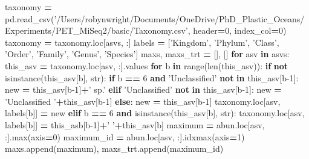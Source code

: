 \documentclass[
]{article}
\newenvironment{Shaded}{\begin{snugshade}}{\end{snugshade}}
\newcommand{\BuiltInTok}[1]{#1}
\newcommand{\ControlFlowTok}[1]{\textcolor[rgb]{0.13,0.29,0.53}{\textbf{#1}}}
\newcommand{\DecValTok}[1]{\textcolor[rgb]{0.00,0.00,0.81}{#1}}
\newcommand{\KeywordTok}[1]{\textcolor[rgb]{0.13,0.29,0.53}{\textbf{#1}}}
\newcommand{\NormalTok}[1]{#1}
\newcommand{\OperatorTok}[1]{\textcolor[rgb]{0.81,0.36,0.00}{\textbf{#1}}}
\newcommand{\StringTok}[1]{\textcolor[rgb]{0.31,0.60,0.02}{#1}}
\begin{document}
\begin{Shaded}
\begin{Highlighting}[]
\NormalTok{taxonomy }\OperatorTok{=}\NormalTok{ pd.read_csv(}\StringTok{'/Users/robynwright/Documents/OneDrive/PhD_Plastic_Oceans/Experiments/PET_MiSeq2/basic/Taxonomy.csv'}\NormalTok{, header}\OperatorTok{=}\DecValTok{0}\NormalTok{, index_col}\OperatorTok{=}\DecValTok{0}\NormalTok{)}
\NormalTok{taxonomy }\OperatorTok{=}\NormalTok{ taxonomy.loc[asvs, :]}
\NormalTok{labels }\OperatorTok{=}\NormalTok{ [}\StringTok{'Kingdom'}\NormalTok{, }\StringTok{'Phylum'}\NormalTok{, }\StringTok{'Class'}\NormalTok{, }\StringTok{'Order'}\NormalTok{, }\StringTok{'Family'}\NormalTok{, }\StringTok{'Genus'}\NormalTok{, }\StringTok{'Species'}\NormalTok{]}
\NormalTok{maxs, maxs_trt }\OperatorTok{=}\NormalTok{ [], []}
\ControlFlowTok{for}\NormalTok{ asv }\KeywordTok{in}\NormalTok{ asvs:}
\NormalTok{  this_asv }\OperatorTok{=}\NormalTok{ taxonomy.loc[asv, :].values}
  \ControlFlowTok{for}\NormalTok{ b }\KeywordTok{in} \BuiltInTok{range}\NormalTok{(}\BuiltInTok{len}\NormalTok{(this_asv)):}
    \ControlFlowTok{if} \KeywordTok{not} \BuiltInTok{isinstance}\NormalTok{(this_asv[b], }\BuiltInTok{str}\NormalTok{):}
      \ControlFlowTok{if}\NormalTok{ b }\OperatorTok{==} \DecValTok{6} \KeywordTok{and} \StringTok{'Unclassified'} \KeywordTok{not} \KeywordTok{in}\NormalTok{ this_asv[b}\DecValTok{-1}\NormalTok{]:}
\NormalTok{        new }\OperatorTok{=}\NormalTok{ this_asv[b}\DecValTok{-1}\NormalTok{]}\OperatorTok{+}\StringTok{' sp.'}
      \ControlFlowTok{elif} \StringTok{'Unclassified'} \KeywordTok{not} \KeywordTok{in}\NormalTok{ this_asv[b}\DecValTok{-1}\NormalTok{]:}
\NormalTok{        new }\OperatorTok{=} \StringTok{'Unclassified '}\OperatorTok{+}\NormalTok{this_asv[b}\DecValTok{-1}\NormalTok{]}
      \ControlFlowTok{else}\NormalTok{:}
\NormalTok{        new }\OperatorTok{=}\NormalTok{ this_asv[b}\DecValTok{-1}\NormalTok{]}
\NormalTok{      taxonomy.loc[asv, labels[b]] }\OperatorTok{=}\NormalTok{ new}
    \ControlFlowTok{elif}\NormalTok{ b }\OperatorTok{==} \DecValTok{6} \KeywordTok{and} \BuiltInTok{isinstance}\NormalTok{(this_asv[b], }\BuiltInTok{str}\NormalTok{):}
\NormalTok{      taxonomy.loc[asv, labels[b]] }\OperatorTok{=}\NormalTok{ this_asb[b}\DecValTok{-1}\NormalTok{]}\OperatorTok{+}\StringTok{' '}\OperatorTok{+}\NormalTok{this_asv[b]}
\NormalTok{  maximum }\OperatorTok{=}\NormalTok{ abun.loc[asv, :].}\BuiltInTok{max}\NormalTok{(axis}\OperatorTok{=}\DecValTok{0}\NormalTok{)}
\NormalTok{  maximum_id }\OperatorTok{=}\NormalTok{ abun.loc[asv, :].idxmax(axis}\OperatorTok{=}\DecValTok{1}\NormalTok{)}
\NormalTok{  maxs.append(maximum), maxs_trt.append(maximum_id)}
\end{Highlighting}
\end{Shaded}
\end{document}
